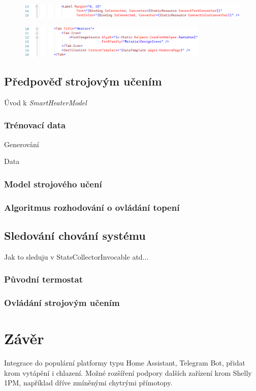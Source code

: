 \begin{figure}[hbt]
\includegraphics[width=\textwidth]{obrazky-figures/code-maui-converters1.png}
\caption{}
\end{figure}

\begin{figure}[hbt]
\includegraphics[width=0.81\textwidth]{obrazky-figures/code-maui-icons.png}
\caption{}
\end{figure}

\section{Předpověď strojovým učením}
Úvod k {\it SmartHeaterModel}

\subsection{Trénovací data}
Generování

Data

\subsection{Model strojového učení}


\subsection{Algoritmus rozhodování o ovládání topení}


\section{Sledování chování systému}
Jak to sleduju v StatsCollectorInvocable atd...


\subsection{Původní termostat}



\subsection{Ovládání strojovým učením}


\chapter{Závěr}
\label{zaver}

Integrace do populární platformy typu Home Assistant, Telegram Bot, přidat krom vytápění i chlazení. Možné rozšíření podpory dalších zařízení krom Shelly 1PM, například dříve zmíněnými chytrými přímotopy.

